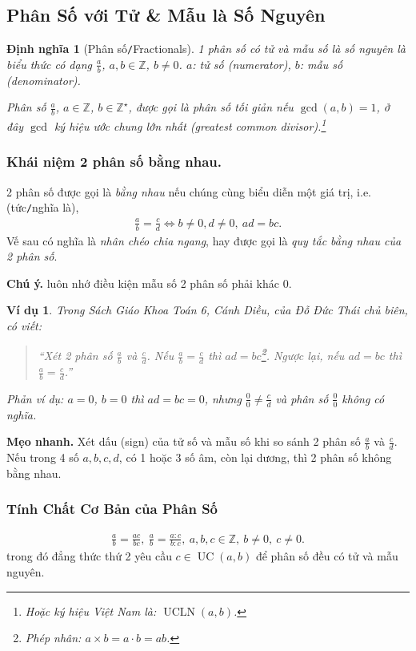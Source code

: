 \documentclass{article}
\numberwithin{equation}{section}
\newtheorem{definition}{Định nghĩa}[section]
\newtheorem{example}{Ví dụ}[section]
\begin{document}
\subsection{Phân Số với Tử \& Mẫu là Số Nguyên}
\begin{definition}[Phân số\texttt{/}Fractionals]
	1 \emph{phân số} có tử và mẫu số là số nguyên là biểu thức có dạng $\frac{a}{b}$, $a,b\in\mathbb{Z}$, $b\ne 0$. $a$: tử số (numerator), $b$: mẫu số (denominator).
	
	Phân số $\frac{a}{b}$, $a\in\mathbb{Z}$, $b\in\mathbb{Z}^\star$, được gọi là \emph{phân số tối giản} nếu $\operatorname{gcd}(a,b) = 1$, ở đây $\operatorname{gcd}$ ký hiệu \emph{ước chung lớn nhất} (greatest common divisor).\footnote{Hoặc ký hiệu Việt Nam là: $\operatorname{UCLN}(a,b)$.}
\end{definition}

\subsubsection{Khái niệm 2 phân số bằng nhau.} 2 phân số được gọi là \textit{bằng nhau} nếu chúng cùng biểu diễn một giá trị, i.e. (tức\texttt{/}nghĩa là),
\begin{align}
	\boxed{\frac{a}{b} = \frac{c}{d}\Leftrightarrow b\ne 0, d\ne 0,\ ad = bc.}
\end{align}
Vế sau có nghĩa là \textit{nhân chéo chia ngang}, hay được gọi là \textit{quy tắc bằng nhau của 2 phân số}.

\textbf{Chú ý.} luôn nhớ điều kiện mẫu số 2 phân số phải khác 0.

\begin{example}
	Trong Sách Giáo Khoa Toán 6, Cánh Diều, của Đỗ Đức Thái chủ biên, có viết:
	\begin{quotation}
		``Xét 2 phân số $\frac{a}{b}$ và $\frac{c}{d}$. Nếu $\frac{a}{b} = \frac{c}{d}$ thì $ad = bc$\footnote{Phép nhân: $a\times b = a\cdot b = ab$.}. Ngược lại, nếu $ad = bc$ thì $\frac{a}{b} = \frac{c}{d}$.''
	\end{quotation}
	Phản ví dụ: $a = 0$, $b = 0$ thì $ad = bc = 0$, nhưng $\frac{0}{0}\ne\frac{c}{d}$ và phân số $\frac{0}{0}$ không có nghĩa.
\end{example}
\textbf{Mẹo nhanh.} Xét dấu (sign) của tử số và mẫu số khi so sánh 2 phân số $\frac{a}{b}$ và $\frac{c}{d}$. Nếu trong 4 số $a,b,c,d$, có 1 hoặc 3 số âm, còn lại dương, thì 2 phân số không bằng nhau.

\subsubsection{Tính Chất Cơ Bản của Phân Số}
\begin{align}
	\boxed{\frac{a}{b} = \frac{ac}{bc},\ \frac{a}{b} = \frac{a:c}{b:c},\ a,b,c\in\mathbb{Z},\ b\ne 0,\ c\ne 0.}
\end{align}
trong đó đẳng thức thứ 2 yêu cầu $c\in\operatorname{UC}(a,b)$ để phân số đều có tử và mẫu nguyên.
\end{document}
